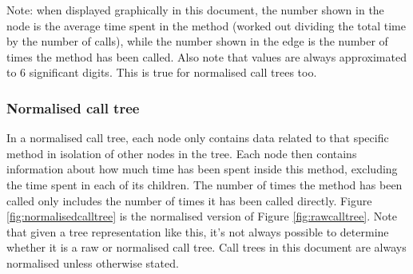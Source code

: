 \noindent Note: when displayed graphically in this document, the number shown in the node is the average time spent in the method (worked out dividing the total time by the number of calls), while the number shown in the edge is the number of times the method has been called. Also note that values are always approximated to 6 significant digits. This is true for normalised call trees too.


\subsubsection{Normalised call tree}
In a normalised call tree, each node only contains data related to that specific method in isolation of other nodes in the tree. Each node then contains information about how much time has been spent inside this method, excluding the time spent in each of its children. The number of times the method has been called only includes the number of times it has been called directly. Figure \ref{fig:normalisedcalltree} is the normalised version of Figure \ref{fig:rawcalltree}. Note that given a tree representation like this, it's not always possible to determine whether it is a raw or normalised call tree. Call trees in this document are always normalised unless otherwise stated.


